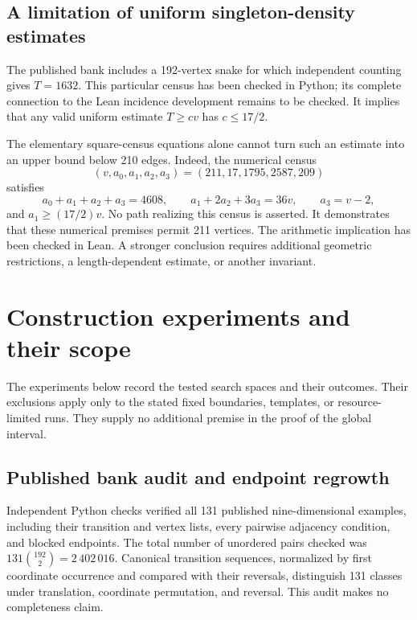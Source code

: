 \documentclass[11pt,a4paper]{article}
\theoremstyle{definition}
\theoremstyle{remark}
\begin{document}
\subsection{A limitation of uniform singleton-density estimates}
The published bank includes a 192-vertex snake for which independent counting gives $T=1632$. This particular census has been checked in Python; its complete connection to the Lean incidence development remains to be checked. It implies that any valid uniform estimate $T\ge cv$ has $c\le17/2$.

The elementary square-census equations alone cannot turn such an estimate into an upper bound below 210 edges. Indeed, the numerical census
\[
(v,a_0,a_1,a_2,a_3)=(211,17,1795,2587,209)
\]
satisfies
\[
a_0+a_1+a_2+a_3=4608,\qquad
 a_1+2a_2+3a_3=36v,\qquad a_3=v-2,
\]
and $a_1\ge(17/2)v$. No path realizing this census is asserted. It demonstrates that these numerical premises permit 211 vertices. The arithmetic implication has been checked in Lean. A stronger conclusion requires additional geometric restrictions, a length-dependent estimate, or another invariant.

\section{Construction experiments and their scope}\label{app:experiments}
The experiments below record the tested search spaces and their outcomes. Their exclusions apply only to the stated fixed boundaries, templates, or resource-limited runs. They supply no additional premise in the proof of the global interval.

\subsection{Published bank audit and endpoint regrowth}
Independent Python checks verified all 131 published nine-dimensional examples, including their transition and vertex lists, every pairwise adjacency condition, and blocked endpoints. The total number of unordered pairs checked was $131\binom{192}{2}=2\,402\,016$. Canonical transition sequences, normalized by first coordinate occurrence and compared with their reversals, distinguish 131 classes under translation, coordinate permutation, and reversal. This audit makes no completeness claim.
\end{document}
